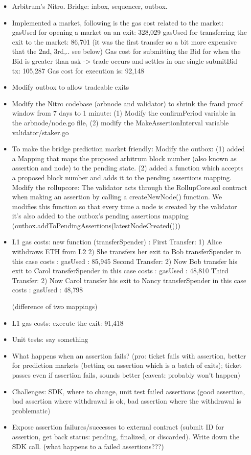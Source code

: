 \begin{itemize}
\item Arbitrum's Nitro. Bridge: inbox, sequencer, outbox.
\item Implemented a market, following is the gas cost related to the market:
gasUsed for opening a market on an exit: 328,029
gasUsed for transferring the exit to the market:  86,701 (it was the first transfer so a bit more expensive that the 2nd, 3rd,.. see below)
Gas cost for submitting the Bid for when the Bid is greater than ask -> trade occurs and settles in one single submitBid tx:  105,287
Gas cost for execution is: 92,148
\item Modify outbox to allow tradeable exits
\item Modify the Nitro codebase (arbnode and validator) to shrink the fraud proof window from 7 days to 1 minute: (1) Modify the confirmPeriod variable in the arbnode/node.go file, (2) modify the MakeAssertionInterval variable validator/staker.go
\item To make the bridge prediction market friendly: 
Modify the outbox: (1) added a Mapping that maps the proposed arbitrum block number (also known as assertion and node) to the pending state. (2) added a function which accepts a proposed block number and adds it to the pending assertions mapping.
Modify the rollupcore: The validator acts through the RollupCore.sol contract when making an assertion by calling a createNewNode() function. We modifies this function so that every time a node is created by the validator it's also added to the outbox's pending assertions mapping (outbox.addToPendingAssertions(latestNodeCreated()))

\item L1 gas costs: new function (transferSpender) : 
First Transfer: 
1) Alice withdraws ETH from L2
2) She transfers her exit to Bob
transferSpender in this case costs : gasUsed : 85,945
Second Transfer: 
2) Now Bob transfer his exit to Carol
transferSpender in this case costs : gasUsed : 48,810
Third Transfer:
2) Now Carol transfer his exit to Nancy
transferSpender in this case costs : gasUsed : 48,798

 (difference of two mappings)

\item L1 gas costs: execute the exit: 91,418

\item Unit tests: say something
\item What happens when an assertion fails? (pro: ticket fails with assertion, better for prediction markets (betting on assertion which is a batch of exits); ticket passes even if assertion fails, sounds better (caveat: probably won't happen)
\item Challenges: SDK, where to change, unit test failed assertions (good assertion, bad assertion where withdrawal is ok, bad assertion where the withdrawal is problematic)
\item Expose assertion failures/successes to external contract (submit ID for assertion, get back status: pending, finalized, or discarded). Write down the SDK call. (what happens to a failed assertions???)
\end{itemize}


